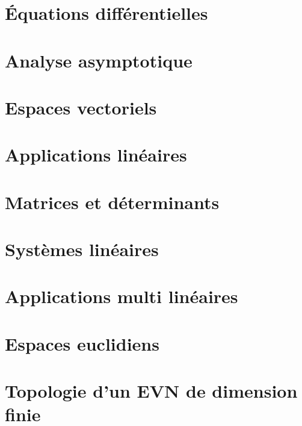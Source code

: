 \chapter{Équations différentielles}
\chapter{Analyse asymptotique}
\chapter{Espaces vectoriels}
\chapter{Applications linéaires}
\chapter{Matrices et déterminants}
\chapter{Systèmes linéaires}
\chapter{Applications multi linéaires}
\chapter{Espaces euclidiens}
\chapter{Topologie d’un EVN de dimension finie}

